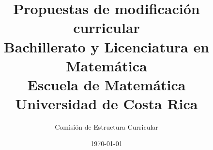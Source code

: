 \newcommand{\inputcurso}[1]{%
  \begingroup
  \renewcommand{\addcontentsline}[3]{}%
  \endgroup
}



\title{Propuestas de modificación curricular\\ \vspace{4pt} \large Bachillerato y Licenciatura en Matemática\\ \vspace{10pt} Escuela de Matemática \\ \vspace{2pt}  Universidad de Costa Rica}
\author{Comisión de Estructura Curricular}
\date{\today}
